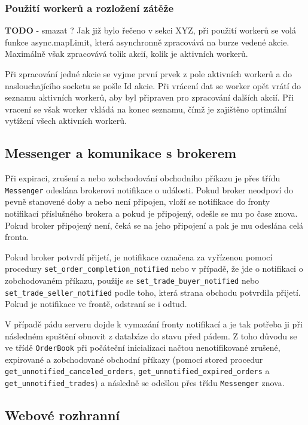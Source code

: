 \documentclass[thesis=M,czech]{FITthesis}[2012/06/26]
\begin{document}
\subsubsection{Použití workerů a rozložení zátěže}
	\textbf{TODO} - smazat ? 
	Jak již bylo řečeno v sekci XYZ, při použití workerů se volá funkce async.mapLimit, která asynchronně zpracovává na burze vedené akcie. Maximálně však zpracovává tolik akcií, kolik je aktivních workerů.
	
	Při zpracování jedné akcie se vyjme první prvek z pole aktivních workerů a do naslouchajícího socketu se pošle Id akcie. Při vrácení dat se worker opět vrátí do seznamu aktivních workerů, aby byl připraven pro zpracování dalších akcií. Při vracení se však worker vkládá na konec seznamu, čímž je zajištěno optimální vytížení všech aktivních workerů.
	
	
\subsection{Messenger a komunikace s brokerem}
\label{sec:messenger}
	Při expiraci, zrušení a nebo zobchodování obchodního příkazu je přes třídu \texttt{Messenger} odeslána brokerovi notifikace o události. Pokud broker neodpoví do pevně stanovené doby a nebo není připojen, vloží se notifikace do fronty notifikací příslušného brokera a pokud je připojený, odešle se mu po čase znova. Pokud broker připojený není, čeká se na jeho připojení a pak je mu odeslána celá fronta.
	
	Pokud broker potvrdí přijetí, je notifikace označena za vyřízenou pomocí procedury \texttt{set\_order\_completion\_notified} nebo v případě, že jde o notifikaci o zobchodovaném příkazu, použije se \texttt{set\_trade\_buyer\_notified} nebo \texttt{set\_trade\_seller\_notified} podle toho, která strana obchodu potvrdila přijetí. Pokud je notifikace ve frontě, odstraní se i odtud.
	
	V případě pádu serveru dojde k vymazání fronty notifikací a je tak potřeba ji při následném spuštění obnovit z databáze do stavu před pádem. Z toho důvodu se ve třídě \texttt{OrderBook} při počáteční inicializaci načtou nenotifikované zrušené, expirované a zobchodované obchodní příkazy (pomocí stored procedur \texttt{get\_unnotified\_canceled\_orders}, \texttt{get\_unnotified\_expired\_orders} a \texttt{get\_unnotified\_trades}) a následně se odešlou přes třídu \texttt{Messenger} znova.
	
\subsection{Webové rozhranní}
\label{sec:market_web}
\end{document}
